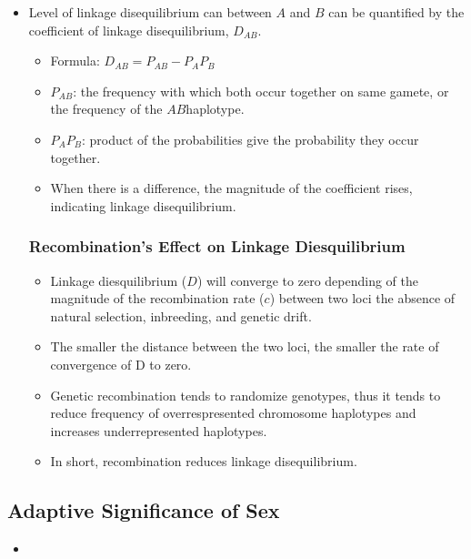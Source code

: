 \documentclass[12pt,a4paper]{article}
\begin{document}
\begin{itemize}
\begin{itemize}
        \end{itemize}
    \item Level of linkage disequilibrium can between \(A\) and \(B\) can be quantified by the {\color{o-Sun}coefficient of linkage disequilibrium, \(D_{AB}\)}.
        \begin{itemize}
            \item Formula: \(D_{AB}=P_{AB} - P_{A}P_{B}\)
            \item \(P_{AB}\): the frequency with which both occur together on same gamete, or the frequency of the \(AB\)haplotype.
            \item \(P_AP_B\): product of the probabilities give the probability they occur together.
            \item When there is a difference, the magnitude of the coefficient rises, indicating linkage disequilibrium.
        \end{itemize}
    \subsubsection{Recombination's Effect on  Linkage Diesquilibrium}
    \begin{itemize}
        \item Linkage diesquilibrium (\(D\)) will converge to zero depending of the magnitude of the recombination rate (\(c\)) between two loci the absence of natural selection, inbreeding, and genetic drift.
        \item The smaller the distance between the two loci, the smaller the rate of convergence of D to zero.
        \item Genetic recombination tends to randomize genotypes, thus it tends to reduce frequency of overrespresented chromosome haplotypes and increases underrepresented haplotypes. 
        \item In short, recombination reduces linkage disequilibrium.
    \end{itemize}
\end{itemize}

\subsection{Adaptive Significance of Sex}
\begin{itemize}
    \item 
\end{itemize}
\end{document}
